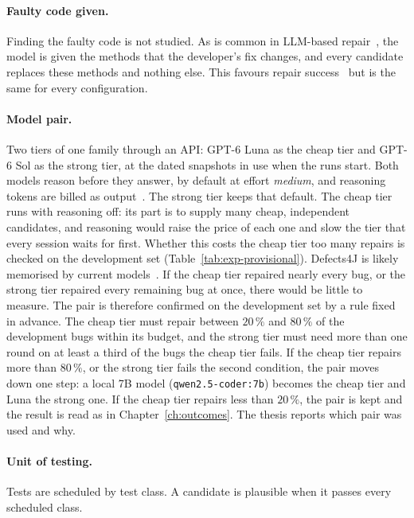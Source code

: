 \paragraph{Faulty code given.} Finding the faulty code is not studied. As is
common in LLM-based repair~\citep{xia2024chatrepair}, the model is given the
methods that the developer's fix changes, and every candidate replaces these
methods and nothing else. This favours repair success~\citep{liu2019flbias}
but is the same for every configuration.

\paragraph{Model pair.} Two tiers of one family through an API: GPT-6 Luna as
the cheap tier and GPT-6 Sol as the strong tier, at the dated snapshots in use
when the runs start. Both models reason before they answer, by default at
effort \emph{medium}, and reasoning tokens are billed as
output~\citep{openai2026models}. The strong tier keeps that default. The cheap
tier runs with reasoning off: its part is to supply many cheap, independent
candidates, and reasoning would raise the price of each one and slow the
tier that every session waits for first. Whether this costs the cheap tier too
many repairs is checked on the development set
(Table~\ref{tab:exp-provisional}). Defects4J is likely memorised by current
models~\citep{ramos2024memorizing}. If the cheap tier repaired nearly every
bug, or the strong tier repaired every remaining bug at once, there would be
little to measure. The pair is therefore confirmed on the development set by a
rule fixed in advance. The cheap tier must repair between $20\,\%$ and
$80\,\%$ of the development bugs within its budget, and the strong tier must
need more than one round on at least a third of the bugs the cheap tier fails.
If the cheap tier repairs more than $80\,\%$, or the strong tier fails the
second condition, the pair moves down one step: a local 7B model
(\texttt{qwen2.5-coder:7b}) becomes the cheap tier and Luna the strong one. If
the cheap tier repairs less than $20\,\%$, the pair is kept and the result is
read as in Chapter~\ref{ch:outcomes}. The thesis reports which pair was used
and why.

\paragraph{Unit of testing.} Tests are scheduled by test class. A candidate is
plausible when it passes every scheduled class.

